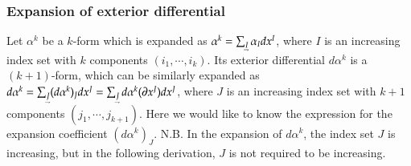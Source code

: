 \documentclass[11pt, a4paper]{book}
\begin{document}
\subsubsection{Expansion of exterior differential}

Let $\alpha^k$ be a $k$-form which is expanded as
$\alpha^k = \sum_{\underaccent{\rightharpoondown}{I}} \alpha_I dx^I$, where $I$ is an
increasing index set with $k$ components $(i_1,\cdots,i_k)$. Its exterior differential
$d\alpha^k$ is a $(k+1)$-form, which can be similarly expanded as
$d\alpha^k = \sum_{\underaccent{\rightharpoondown}{J}} (d\alpha^k)_J dx^J =
\sum_{\underaccent{\rightharpoondown}{J}} d\alpha^k(\vect{\pdiff}x^J) dx^J$, where $J$ is
an increasing index set with $k+1$ components $(j_1,\cdots,j_{k+1})$. Here we would like
to know the expression for the expansion coefficient $(d\alpha^k)_{J}$. N.B. In the
expansion of $d\alpha^k$, the index set $J$ is increasing, but in the following
derivation, $J$ is not required to be increasing.
\end{document}

